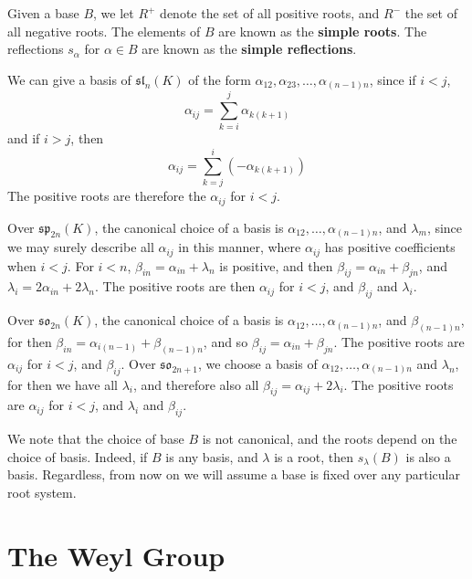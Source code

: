 Given a base $B$, we let $R^+$ denote the set of all positive roots, and $R^-$ the set of all negative roots. The elements of $B$ are known as the {\bf simple roots}. The reflections $s_\alpha$ for $\alpha \in B$ are known as the {\bf simple reflections}.

\begin{example}
    We can give a basis of $\mathfrak{sl}_n(K)$ of the form $\alpha_{12}, \alpha_{23}, \dots, \alpha_{(n-1)n}$, since if $i < j$,
    \[ \alpha_{ij} = \sum_{k = i}^j \alpha_{k(k+1)} \]
    and if $i > j$, then
    \[ \alpha_{ij} = \sum_{k = j}^i (-\alpha_{k(k+1)}) \]
    The positive roots are therefore the $\alpha_{ij}$ for $i < j$.
\end{example}

\begin{example}
    Over $\mathfrak{sp}_{2n}(K)$, the canonical choice of a basis is $\alpha_{12}, \dots, \alpha_{(n-1)n}$, and $\lambda_m$, since we may surely describe all $\alpha_{ij}$ in this manner, where $\alpha_{ij}$ has positive coefficients when $i < j$. For $i < n$, $\beta_{in} = \alpha_{in} + \lambda_n$ is positive, and then $\beta_{ij} = \alpha_{in} + \beta_{jn}$, and $\lambda_i = 2 \alpha_{in} + 2\lambda_n$. The positive roots are then $\alpha_{ij}$ for $i < j$, and $\beta_{ij}$ and $\lambda_i$.
\end{example}

\begin{example}
    Over $\mathfrak{so}_{2n}(K)$, the canonical choice of a basis is $\alpha_{12}, \dots, \alpha_{(n-1)n}$, and $\beta_{(n-1)n}$, for then $\beta_{in} = \alpha_{i(n-1)} + \beta_{(n-1)n}$, and so $\beta_{ij} = \alpha_{in} + \beta_{jn}$. The positive roots are $\alpha_{ij}$ for $i < j$, and $\beta_{ij}$. Over $\mathfrak{so}_{2n+1}$, we choose a basis of $\alpha_{12}, \dots, \alpha_{(n-1)n}$ and $\lambda_n$, for then we have all $\lambda_i$, and therefore also all $\beta_{ij} = \alpha_{ij} + 2 \lambda_i$. The positive roots are $\alpha_{ij}$ for $i < j$, and $\lambda_i$ and $\beta_{ij}$.
\end{example}

We note that the choice of base $B$ is not canonical, and the roots depend on the choice of basis. Indeed, if $B$ is any basis, and $\lambda$ is a root, then $s_\lambda(B)$ is also a basis. Regardless, from now on we will assume a base is fixed over any particular root system.

\section{The Weyl Group}


